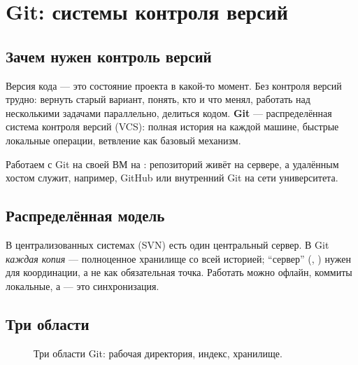 \chapter{Git: системы контроля версий}
\label{ch:25-git}

\section{Зачем нужен контроль версий}

Версия кода --- это состояние проекта в какой-то
момент. Без контроля версий трудно: вернуть старый
вариант, понять, кто и что менял, работать над
несколькими задачами параллельно, делиться кодом.
\textbf{Git} --- распределённая система контроля
версий (VCS): полная история на каждой машине,
быстрые локальные операции, ветвление как базовый
механизм.

Работаем с Git на своей ВМ на : репозиторий
живёт на сервере, а удалённым хостом служит, например, GitHub
или внутренний Git на сети университета.

\section{Распределённая модель}

В централизованных системах (SVN) есть один центральный
сервер. В Git \emph{каждая копия} --- полноценное
хранилище со всей историей; ``сервер''
(, ) нужен для
координации, а не как обязательная точка. Работать
можно офлайн, коммиты локальные, а  ---
это синхронизация.

\section{Три области}

\begin{figure}[htb]
  \centering
  \caption{Три области Git: рабочая директория, индекс, хранилище.}
  \label{fig:git-areas}
\end{figure}


